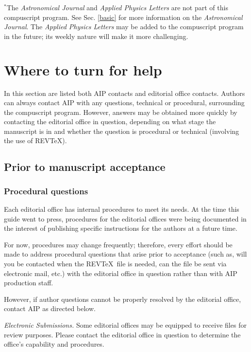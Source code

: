 $^*$The {\em Astronomical Journal} and {\em Applied Physics Letters} are
not part of this compuscript program. See Sec. \ref{basic} for more
information on the {\em Astronomical Journal}. The {\em Applied Physics
Letters} may be added to the compuscript program in the future; its weekly
nature will make it more challenging.


\section{Where to turn for help}

In this section are listed both AIP contacts and editorial office contacts.
Authors can always contact AIP with any questions, technical or procedural,
surrounding the compuscript program.  However, answers may be obtained more
quickly by contacting the editorial office in question, depending on what
stage the manuscript is in and whether the question is procedural or
technical (involving the use of REV\TeX ).


\subsection{Prior to manuscript acceptance}
\subsubsection{Procedural questions}

Each editorial office has internal procedures to meet its needs.  At the
time this guide went to press, procedures for the editorial offices were
being documented in the interest of publishing specific instructions for
the authors at a future time.

For now, procedures may change frequently; therefore, every effort should
be made to address procedural questions that arise prior to acceptance
(such as, will you be contacted when the  REV\TeX\ file is needed, can the
file be sent via electronic mail, etc.) with the editorial office in
question rather than with AIP production staff.

However,  if author questions cannot be properly resolved by the editorial
office, contact AIP as directed below.

{\em Electronic Submissions.}  Some editorial offices may be equipped to
receive files for review purposes.  Please contact the editorial office in
question to determine the office's capability and procedures.





